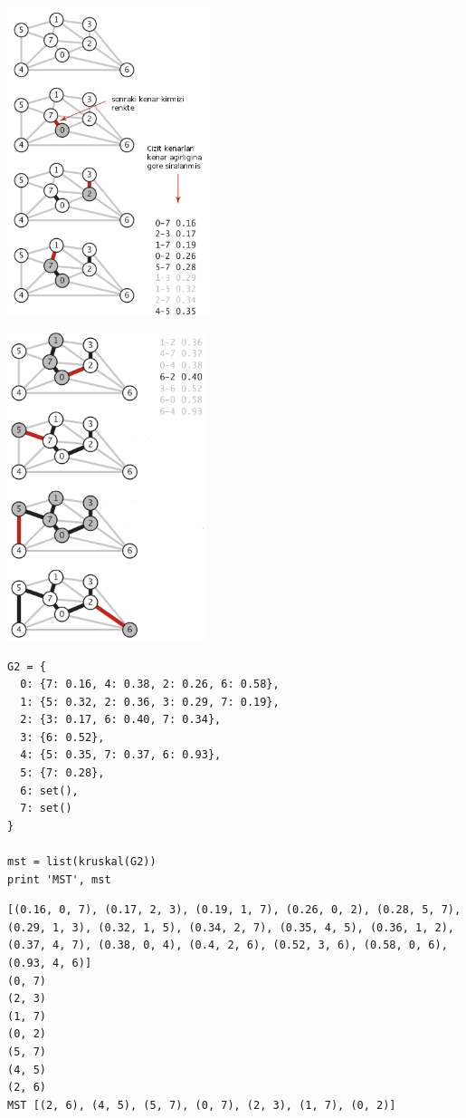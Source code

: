 \documentclass[12pt,fleqn]{article}\usepackage{../common}
\begin{document}
\includegraphics[height=9cm]{sedge_krus_1.png}

\includegraphics[height=9cm]{sedge_krus_2.png}


\begin{verbatim}
G2 = {
  0: {7: 0.16, 4: 0.38, 2: 0.26, 6: 0.58},
  1: {5: 0.32, 2: 0.36, 3: 0.29, 7: 0.19},
  2: {3: 0.17, 6: 0.40, 7: 0.34},
  3: {6: 0.52},
  4: {5: 0.35, 7: 0.37, 6: 0.93},
  5: {7: 0.28},
  6: set(),
  7: set()
} 

mst = list(kruskal(G2))
print 'MST', mst
\end{verbatim}

\begin{verbatim}
[(0.16, 0, 7), (0.17, 2, 3), (0.19, 1, 7), (0.26, 0, 2), (0.28, 5, 7), (0.29, 1, 3), (0.32, 1, 5), (0.34, 2, 7), (0.35, 4, 5), (0.36, 1, 2), (0.37, 4, 7), (0.38, 0, 4), (0.4, 2, 6), (0.52, 3, 6), (0.58, 0, 6), (0.93, 4, 6)]
(0, 7)
(2, 3)
(1, 7)
(0, 2)
(5, 7)
(4, 5)
(2, 6)
MST [(2, 6), (4, 5), (5, 7), (0, 7), (2, 3), (1, 7), (0, 2)]
\end{verbatim}
\end{document}
